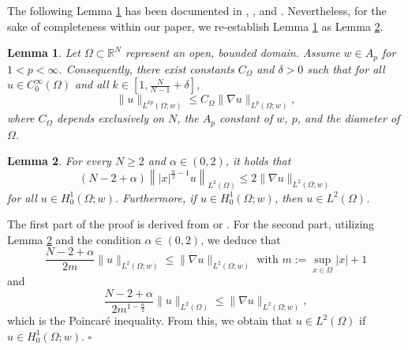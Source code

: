 \documentclass[11pt]{article}
\newtheorem{lemma}{Lemma}[section]
\newenvironment{proof}{{\bf {Proof.}}}{\hfill $\square$}
\numberwithin{equation}{section}
\def\bf{\textbf}
\begin{document}
  The following Lemma \ref{08.16.L3} has been documented in \cite[theorem 1.3]{Fabes}, \cite[section 1.4, p.9]{Heinonen}, and \cite{Trudinger}. Nevertheless, for the sake of completeness within our paper, we re-establish Lemma \ref{08.16.L3} as Lemma \ref{08.15.L1}.
\begin{lemma}\label{08.16.L3}
Let $\Omega \subset \mathbb{R}^N$ represent an open, bounded domain. Assume $w \in A_p$ for $1 < p < \infty$. Consequently, there exist constants $C_\Omega$ and $\delta > 0$ such that for all $u \in C_0^\infty(\Omega)$ and all $k \in \left[1, \frac{N}{N - 1} + \delta\right]$,
\begin{equation*}
\|u\|_{L^{kp}(\Omega; w)} \leq C_\Omega \|\nabla u\|_{L^p(\Omega; w)},
\end{equation*}
where $C_\Omega$ depends exclusively on $N$, the $A_p$ constant of $w$, $p$, and the diameter of $\Omega$.
\end{lemma}
\begin{lemma}\label{08.15.L1}
For every $N \geq 2$ and $\alpha \in (0, 2)$, it holds that
\begin{equation*}
(N - 2 + \alpha)\left\||x|^{\frac{\alpha}{2} - 1}u\right\|_{L^2(\Omega)} \leq 2\|\nabla u\|_{L^2(\Omega; w)}
\end{equation*}
for all $u \in H_0^1(\Omega; w)$. Furthermore, if $u \in H_0^1(\Omega; w)$, then $u \in L^2(\Omega)$.
\end{lemma}
 \begin{proof}
The first part of the proof is derived from \cite[lemma 3.1]{Wu} or \cite[proposition 2.1(1)]{Stuart}.
For the second part, utilizing Lemma \ref{08.15.L1} and the condition $\alpha \in (0, 2)$, we deduce that
\begin{equation}\label{12.09.2}
\frac{N - 2 + \alpha}{2m}\|u\|_{L^2(\Omega; w)} \leq \|\nabla u\|_{L^2(\Omega; w)}   \text{ with } m := \sup_{x \in \Omega}|x| + 1
\end{equation}
and
\begin{equation}\label{08.15.10}
\frac{N - 2 + \alpha}{2m^{1 - \frac{\alpha}{2}}}\|u\|_{L^2(\Omega)} \leq \|\nabla u\|_{L^2(\Omega; w)},
\end{equation}
which is the Poincar\'{e} inequality. From this, we obtain that $u \in L^2(\Omega)$ if $u \in H_0^1(\Omega; w)$.
\end{proof}
\end{document}
